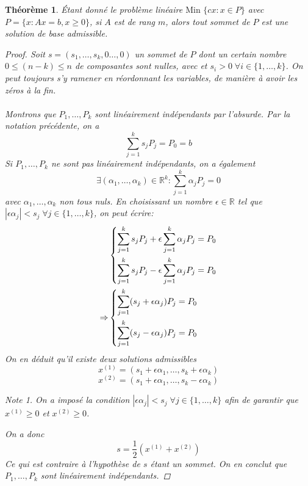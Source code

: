 \documentclass[a4paper]{report}
\theoremstyle{definition}
\theoremstyle{remark}
\newtheorem*{note}{Note}
\theoremstyle{plain}
\newtheorem{theorem}{Théorème}
\begin{document}
\begin{theorem}
\label{th:vertexIsBase}
Étant donné le problème linéaire \(\text{Min }\{cx:x\in P\}\) avec
\(P = \{x:Ax=b,x\ge 0\}\), si \(A\) est de rang \(m\), alors tout sommet de
\(P\) est une solution de base admissible.

\begin{proof}
Soit \(s=(s_1,\dots,s_k,0\dots,0)\) un sommet de \(P\) dont un certain nombre
\(0\le (n-k) \le n\) de composantes sont nulles, avec et \(s_i>0\;\forall
i\in\{1,\dots,k\}\). On peut toujours s'y ramener en réordonnant les variables,
de manière à avoir les zéros à la fin.

\paragraph{}
Montrons que \(P_1,\dots,P_k\) sont linéairement indépendants par l'absurde. Par
la notation précédente, on a
\[\sum_{j=1}^ks_jP_j=P_0=b\]
Si \(P_1,\dots,P_k\) ne sont pas linéairement indépendants, on a également
\[\exists (\alpha_1,\dots,\alpha_k)\in\mathbb{R}^k:\sum_{j=1}^k\alpha_jP_j=0\]
avec \(\alpha_1,\dots,\alpha_k\) non tous nuls. En choisissant un nombre
\(\epsilon\in\mathbb{R}\) tel que \(|\epsilon \alpha_j|< s_j \;\forall
j\in\{1,\dots,k\}\), on peut écrire:
\begin{align}
	&\begin{dcases}
		\sum_{j=1}^ks_jP_j+\epsilon\sum_{j=1}^k\alpha_jP_j=P_0 \\
		\sum_{j=1}^ks_jP_j-\epsilon\sum_{j=1}^k\alpha_jP_j=P_0 \\
	\end{dcases}\\
	\Rightarrow&\begin{dcases}
		\sum_{j=1}^k(s_j+\epsilon\alpha_j)P_j=P_0 \\
		\sum_{j=1}^k(s_j-\epsilon\alpha_j)P_j=P_0
	\end{dcases}
\end{align}
On en déduit qu'il existe deux solutions admissibles
\[x^{(1)} = (s_1+\epsilon\alpha_1,\dots,s_k+\epsilon\alpha_k)\]
\[x^{(2)} = (s_1+\epsilon\alpha_1,\dots,s_k-\epsilon\alpha_k)\]
\begin{note}
On a imposé la condition \(|\epsilon \alpha_j|< s_j \;\forall j\in\{1,\dots,k\}\) afin
de garantir que \(x^{(1)}\ge0\) et \(x^{(2)}\ge0\).
\end{note}
On a donc
\[s=\frac{1}{2}(x^{(1)}+x^{(2)})\]
Ce qui est contraire à l'hypothèse de \(s\) étant un sommet. On en conclut que
\(P_1,\dots,P_k\) sont linéairement indépendants.


\end{proof}
\end{theorem}
\end{document}
